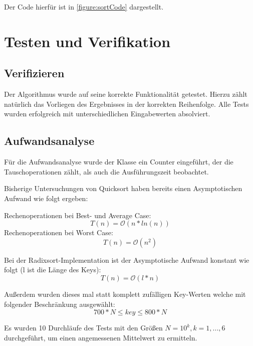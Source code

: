 \documentclass[11pt]{scrartcl}
\begin{document}
		Der Code hierfür ist in \ref{figure:sortCode} dargestellt.

\section{Testen und Verifikation}
\label{sec:vertests}

	\subsection{Verifizieren}
		\label{sec:veri}
		
		Der Algorithmus wurde auf seine korrekte Funktionalität getestet.
		Hierzu zählt natürlich das Vorliegen des Ergebnisses in der korrekten Reihenfolge.
		Alle Tests wurden erfolgreich mit unterschiedlichen Eingabewerten absolviert.
	
	\subsection{Aufwandsanalyse}
		\label{sec:aufwand}
		
		Für die Aufwandsanalyse wurde der Klasse ein Counter eingeführt, der die Tauschoperationen zählt, als auch die Ausführungszeit beobachtet. 
		
		Bisherige Untersuchungen von Quicksort haben bereits einen Asymptotischen Aufwand wie folgt ergeben:

		Rechenoperationen bei Best- und Average Case:
		\begin{equation*}
		T(n) = \mathcal{O}(n*ln(n))
		\end{equation*}
		Rechenoperationen bei Worst Case:
		\begin{equation*}
		T(n) = \mathcal{O}(n^{2})
		\end{equation*}

		Bei der Radixsort-Implementation ist der Asymptotische Aufwand konstant wie folgt (l ist die Länge des Keys):
		\begin{equation*}
		T(n) = \mathcal{O}(l*n)
		\end{equation*}
        
		Außerdem wurden dieses mal statt komplett zufälligen Key-Werten welche mit folgender Beschränkung ausgewählt: 
		\begin{equation*}
		700*N \leq key \leq 800*N
		\end{equation*}
        
		Es wurden 10 Durchläufe des Tests mit den Größen $N=10^k, k=1,...,6$ durchgeführt, um einen angemessenen Mittelwert zu ermitteln.
\end{document}
